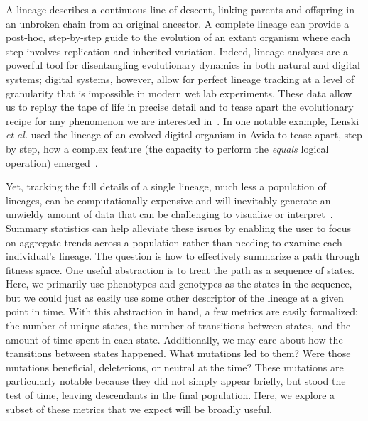 \documentclass[letterpaper]{article}
\begin{document}
A lineage describes a continuous line of descent, linking parents and offspring in an unbroken chain from an original ancestor.
A complete lineage can provide a post-hoc, step-by-step guide to the evolution of an extant organism where each step involves replication and inherited variation. Indeed, lineage analyses are a powerful tool for disentangling evolutionary dynamics in both natural and digital systems; digital systems, however, allow for perfect lineage tracking at a level of granularity that is impossible in modern wet lab experiments.  These data allow us to replay the tape of life in precise detail and to tease apart the evolutionary recipe for any phenomenon we are interested in~\citep{mcphee_using_2016}. 
In one notable example, Lenski \textit{et al.} used the lineage of an evolved digital organism in Avida to tease apart, step by step, how a complex feature (the capacity to perform the \textit{equals} logical operation) emerged~\citep{lenski_evolutionary_2003}. 

Yet, tracking the full details of a single lineage, much less a population of lineages, can be computationally expensive and will inevitably generate an unwieldy amount of data that can be challenging to visualize or interpret~\citep{mcphee_visualizing_2016}. Summary statistics can help alleviate these issues by enabling the user to focus on aggregate trends across a population rather than needing to examine each individual's lineage. The question is how to effectively summarize a path through fitness space. One useful abstraction is to treat the path as a sequence of states. Here, we primarily use phenotypes and genotypes as the states in the sequence, but we could just as easily use some other descriptor of the lineage at a given point in time. With this abstraction in hand, a few metrics are easily formalized: the number of unique states, the number of transitions between states, and the amount of time spent in each state. Additionally, we may care about how the transitions between states happened. What mutations led to them? Were those mutations beneficial, deleterious, or neutral at the time? These mutations are particularly notable because they did not simply appear briefly, but stood the test of time, leaving descendants in the final population. Here, we explore a subset of these metrics that we expect will be broadly useful.
\end{document}
